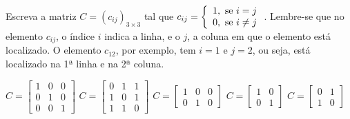 Escreva a matriz $C=(c_{ij})_{3\times 3}$ tal que $c_{ij}=\left\{ \begin{array}{l}
1,\textnormal{ se } i=j\\
0,\textnormal{ se } i\neq j
\end{array} \right.$. Lembre-se que no elemento $c_{ij}$, o índice $i$ indica a linha, e o $j$, a coluna em que o elemento está localizado. O elemento $c_{12}$, por exemplo, tem $i=1$ e $j=2$, ou seja, está localizado na 1ª linha e na 2ª coluna.

$C = \left[ \begin{array}{ccc} 1 & 0 & 0 \\0 & 1 & 0\\ 0 & 0 & 1 \end{array} \right]$
$C = \left[ \begin{array}{ccc} 0 & 1 & 1 \\1 & 0 & 1\\ 1 & 1 & 0 \end{array} \right]$
$C = \left[ \begin{array}{ccc} 1 & 0 & 0 \\0 & 1 & 0 \end{array} \right]$
$C = \left[ \begin{array}{cc} 1 & 0 \\0 & 1 \end{array} \right]$
$C = \left[ \begin{array}{cc} 0 & 1 \\1 & 0 \end{array} \right]$



